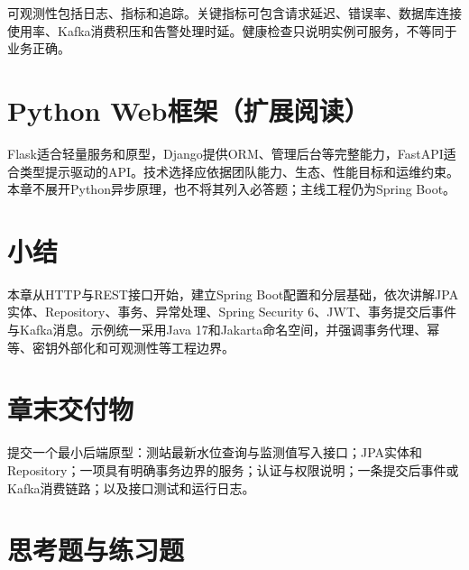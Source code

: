 可观测性包括日志、指标和追踪。关键指标可包含请求延迟、错误率、数据库连接使用率、Kafka消费积压和告警处理时延。健康检查只说明实例可服务，不等同于业务正确。

\section{Python Web框架（扩展阅读）}

Flask适合轻量服务和原型，Django提供ORM、管理后台等完整能力，FastAPI适合类型提示驱动的API。技术选择应依据团队能力、生态、性能目标和运维约束。本章不展开Python异步原理，也不将其列入必答题；主线工程仍为Spring Boot。

\section*{小结}

本章从HTTP与REST接口开始，建立Spring Boot配置和分层基础，依次讲解JPA实体、Repository、事务、异常处理、Spring Security 6、JWT、事务提交后事件与Kafka消息。示例统一采用Java 17和Jakarta命名空间，并强调事务代理、幂等、密钥外部化和可观测性等工程边界。

\section*{章末交付物}

提交一个最小后端原型：测站最新水位查询与监测值写入接口；JPA实体和Repository；一项具有明确事务边界的服务；认证与权限说明；一条提交后事件或Kafka消费链路；以及接口测试和运行日志。

\section*{思考题与练习题}

